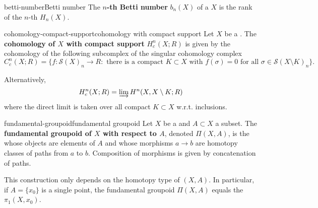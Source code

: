 \begin{topic}{betti-number}{Betti number}
    The \textbf{$n$-th Betti number} $b_n(X)$ of a  $X$ is the rank of the $n$-th  $H_n(X)$.
\end{topic}

\begin{topic}{cohomology-compact-support}{cohomology with compact support}
    Let $X$ be a . The \textbf{cohomology of $X$ with compact support} $H_c^n(X; R)$ is given by the cohomology of the following subcomplex of the singular cohomology complex
    \[ C_c^n(X; R) = \big\{ f : \mathcal{S}(X)_n \to R : \text{ there is a compact $K \subset X$ with $f(\sigma) = 0$ for all $\sigma \in \mathcal{S}(X \setminus K)_n$} \big\} . \]
    
    Alternatively,
    \[ H_c^n(X; R) = \varinjlim H^n(X, X \setminus K; R) \]
    where the direct limit is taken over all compact $K \subset X$ w.r.t. inclusions.
\end{topic}

\begin{topic}{fundamental-groupoid}{fundamental groupoid}
    Let $X$ be a  and $A \subset X$ a subset. The \textbf{fundamental groupoid of $X$ with respect to $A$}, denoted $\Pi(X, A)$, is the  whose objects are elements of $A$ and whose morphisms $a \to b$ are homotopy classes of paths from $a$ to $b$. Composition of morphisms is given by concatenation of paths.
    
    This construction only depends on the homotopy type of $(X, A)$. In particular, if $A = \{ x_0 \}$ is a single point, the fundamental groupoid $\Pi(X, A)$ equals the  $\pi_1(X, x_0)$.
\end{topic}

